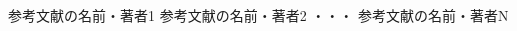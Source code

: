 \documentclass[a4paper,11pt]{jsarticle} %
\begin{document}
\begin{thebibliography}{数字}
	 参考文献の名前・著者1
	 参考文献の名前・著者2
	・・・
	 参考文献の名前・著者N
\end{thebibliography}
\end{document}
